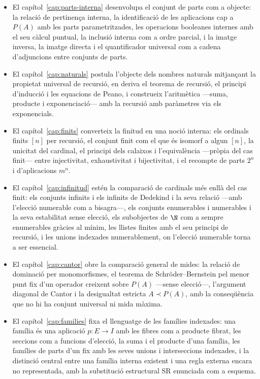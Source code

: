 \begin{itemize}
  \item El capítol~\ref{cap:parts-interna} desenvolupa el conjunt de parts com a objecte: la relació de pertinença interna, la identificació de les aplicacions cap a $P(A)$ amb les parts parametritzades, les operacions booleanes internes amb el seu càlcul puntual, la inclusió interna com a ordre parcial, i la imatge inversa, la imatge directa i el quantificador universal com a cadena d'adjuncions entre conjunts de parts.
  \item El capítol~\ref{cap:naturals} postula l'objecte dels nombres naturals mitjançant la propietat universal de recursió, en deriva el teorema de recursió, el principi d'inducció i les equacions de Peano, i construeix l'aritmètica ---suma, producte i exponenciació--- amb la recursió amb paràmetres via els exponencials.
  \item El capítol~\ref{cap:finits} converteix la finitud en una noció interna: els ordinals finits $[n]$ per recursió, el conjunt finit com el que és isomorf a algun $[n]$, la unicitat del cardinal, el principi dels calaixos i l'equivalència ---pròpia del cas finit--- entre injectivitat, exhaustivitat i bijectivitat, i el recompte de parts $2^n$ i d'aplicacions $m^n$.
  \item El capítol~\ref{cap:infinitud} estén la comparació de cardinals més enllà del cas finit: els conjunts infinits i els infinits de Dedekind i la seva relació ---amb l'elecció numerable com a bisagra---, els conjunts enumerables i numerables i la seva estabilitat sense elecció, els subobjectes de $\N$ com a sempre enumerables gràcies al mínim, les llistes finites amb el seu principi de recursió, i les unions indexades numerablement, on l'elecció numerable torna a ser essencial.
  \item El capítol~\ref{cap:cantor} obre la comparació general de mides: la relació de dominació per monomorfismes, el teorema de Schröder--Bernstein pel menor punt fix d'un operador creixent sobre $P(A)$ ---sense elecció---, l'argument diagonal de Cantor i la desigualtat estricta $A\prec P(A)$, amb la conseqüència que no hi ha conjunt universal ni mida màxima.
  \item El capítol~\ref{cap:families} fixa el llenguatge de les famílies indexades: una família és una aplicació $p\colon E\to I$ amb les fibres com a producte fibrat, les seccions com a funcions d'elecció, la suma i el producte d'una família, les famílies de parts d'un fix amb les seves unions i interseccions indexades, i la distinció central entre una família interna existent i una regla externa encara no representada, amb la substitució estructural SR enunciada com a esquema.

\end{itemize}
